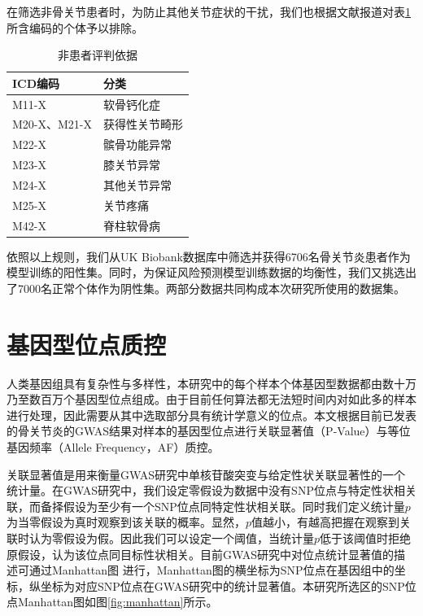在筛选非骨关节患者时，为防止其他关节症状的干扰，我们也根据文献报道对表\ref{ICD_exclude}所含编码的个体予以排除。

\begin{table}[!h]
	\renewcommand{\arraystretch}{1.2}
	\centering\wuhao
	\caption{非患者评判依据} \label{ICD_exclude} \vspace{2mm}
	\begin{tabularx}{\textwidth} { 
   >{\centering\arraybackslash}X 
   >{\centering\arraybackslash}X }
	\toprule[1.5pt]
		ICD编码 & 分类 \\
	\midrule[1pt]
		M11-X & 软骨钙化症 \\
        M20-X、M21-X & 获得性关节畸形 \\
        M22-X & 髌骨功能异常 \\
        M23-X & 膝关节异常 \\
        M24-X & 其他关节异常 \\
        M25-X & 关节疼痛 \\
        M42-X & 脊柱软骨病 \\
	\bottomrule[1.5pt]
	\end{tabularx}
\end{table}

依照以上规则，我们从UK Biobank数据库中筛选并获得6706名骨关节炎患者作为模型训练的阳性集。同时，为保证风险预测模型训练数据的均衡性，我们又挑选出了7000名正常个体作为阴性集。两部分数据共同构成本次研究所使用的数据集。

\section{基因型位点质控}

人类基因组具有复杂性与多样性，本研究中的每个样本个体基因型数据都由数十万乃至数百万个基因型位点组成。由于目前任何算法都无法短时间内对如此多的样本进行处理，因此需要从其中选取部分具有统计学意义的位点。本文根据目前已发表的骨关节炎的GWAS结果\cite{zengini_genome-wide_2018,arcogen_consortium_identification_2019}对样本的基因型位点进行关联显著值（P-Value）与等位基因频率（Allele Frequency，AF）质控。

关联显著值是用来衡量GWAS研究中单核苷酸突变与给定性状关联显著性的一个统计量。在GWAS研究中，我们设定零假设为数据中没有SNP位点与特定性状相关联，而备择假设为至少有一个SNP位点同特定性状相关联。同时我们定义统计量$p$为当零假设为真时观察到该关联的概率。显然，$p$值越小，有越高把握在观察到关联时认为零假设为假。因此我们可以设定一个阈值，当统计量$p$低于该阈值时拒绝原假设，认为该位点同目标性状相关。\cite{chen_revisiting_2021}目前GWAS研究中对位点统计显著值的描述可通过Manhattan图
进行，Manhattan图的横坐标为SNP位点在基因组中的坐标，纵坐标为对应SNP位点在GWAS研究中的统计显著值。本研究所选区的SNP位点Manhattan图如图\ref{fig:manhattan}所示。

